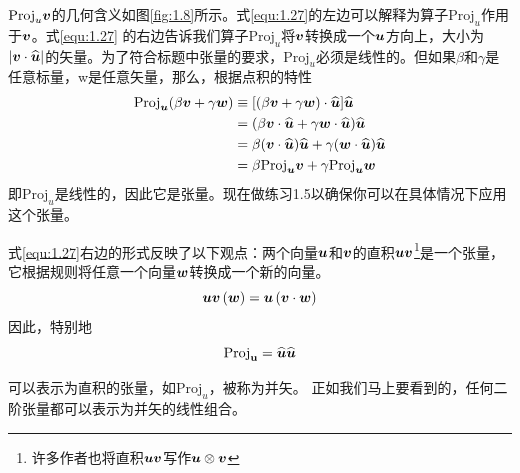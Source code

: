 $\mathrm{Proj}_u\boldsymbol{v}$的几何含义如图\eqref{fig:1.8}所示。式\eqref{equ:1.27}的左边可以解释为算子$\mathrm{Proj}_u$作用于$\boldsymbol{v}$。式\eqref{equ:1.27} 的右边告诉我们算子$\mathrm{Proj}_u$将$\boldsymbol{v}$转换成一个$\boldsymbol{u}$方向上，大小为$\left| \boldsymbol{v}\cdot \widehat{\boldsymbol{u}} \right|$的矢量。为了符合标题中张量的要求，$\mathrm{Proj}_u$必须是线性的。但如果$\beta $和$\gamma $是任意标量，w是任意矢量，那么，根据点积的特性
\begin{align}
	\mathrm{Proj}_{\boldsymbol{u}}(\beta \boldsymbol{v}+\gamma \boldsymbol{w})&\equiv [(\beta \boldsymbol{v}+\gamma \boldsymbol{w})\cdot \widehat{\boldsymbol{u}}]\widehat{\boldsymbol{u}}\nonumber\\
	&=(\beta \boldsymbol{v}\cdot \widehat{\boldsymbol{u}}+\gamma \boldsymbol{w}\cdot \widehat{\boldsymbol{u}})\widehat{\boldsymbol{u}}\nonumber\\
	&=\beta (\boldsymbol{v}\cdot \widehat{\boldsymbol{u}})\widehat{\boldsymbol{u}}+\gamma (\boldsymbol{w}\cdot \widehat{\boldsymbol{u}})\widehat{\boldsymbol{u}}\nonumber\\
	&=\beta \mathrm{Proj}_{\boldsymbol{u}}\boldsymbol{v}+\gamma \mathrm{Proj}_{\boldsymbol{u}}\boldsymbol{w}\label{equ:1.28}
\end{align}
即$\mathrm{Proj}_u$是线性的，因此它是张量。现在做练习1.5以确保你可以在具体情况下应用这个张量。

式\eqref{equ:1.27}右边的形式反映了以下观点：两个向量$\boldsymbol{u}$和$\boldsymbol{v}$的直积$\boldsymbol{uv}$\footnote{许多作者也将直积$\boldsymbol{uv}$写作$\boldsymbol{u}\otimes \boldsymbol{v}$}是一个张量，它根据规则将任意一个向量$\boldsymbol{w}$转换成一个新的向量。
\begin{equation}\label{equ:1.29}
    \boldsymbol{uv}\left( \boldsymbol{w} \right) =\boldsymbol{u}\left( \boldsymbol{v}\cdot \boldsymbol{w} \right) 
\end{equation}
因此，特别地
\begin{equation}\label{equ:1.30}
    \mathrm{Proj}_{\mathbf{u}}=\widehat{\boldsymbol{u}}\widehat{\boldsymbol{u}}
\end{equation}

可以表示为直积的张量，如$\mathrm{Proj}_u$，被称为并矢。 正如我们马上要看到的，任何二阶张量都可以表示为并矢的线性组合。




